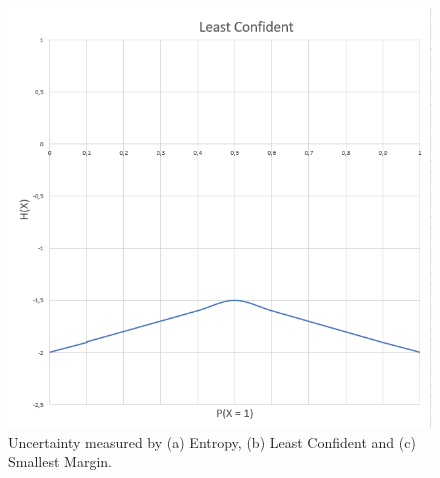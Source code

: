 \begin{figure}
\begin{minipage}{.33\textwidth}
    \end{minipage}
    \begin{minipage}{.33\textwidth}
      \centering
      \includegraphics[width=0.9\linewidth]{figures/least_confident_graph.PNG}
    \end{minipage}%
    \caption{Uncertainty measured by (a) Entropy, (b) Least Confident and (c) Smallest Margin.}
    \label{fig:test}
\end{figure}
